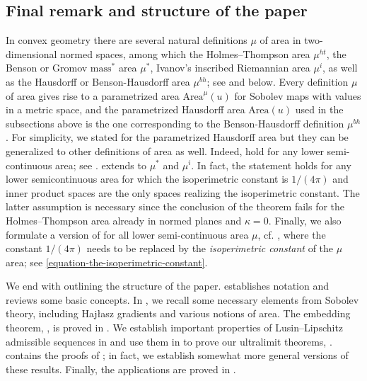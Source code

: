 \documentclass[a4paper,leqno]{amsart}
\numberwithin{equation}{section}
\theoremstyle{remark}
\theoremstyle{remark}
\begin{document}
\subsection{Final remark and structure of the paper}\label{section-structure-of-the-paper}
In convex geometry there are several natural definitions $\mu$ of area in two-dimensional normed spaces, among which the Holmes--Thompson area $\mu^{ht}$, the Benson or Gromov $\text{mass}^{*}$ area $\mu^{*}$, Ivanov's inscribed Riemannian area $\mu^{i}$, as well as the Hausdorff or Benson-Hausdorff area $\mu^{bh}$; see \cite{alvarez-thompson-2004-volumes-on-normed-and-finsler-spaces} and  below. Every definition $\mu$ of area gives rise to a parametrized area $\mathrm{Area}^\mu(u)$ for Sobolev maps with values in a metric space, and the parametrized Hausdorff area $\mathrm{Area}(u)$ used in the subsections above is the one corresponding to the Benson-Hausdorff definition $\mu^{bh}$. For simplicity, we stated  for the parametrized Hausdorff area but they can be generalized to other definitions of area as well. Indeed,  hold for any lower semi-continuous area; see .   extends to $\mu^*$ and $\mu^{i}$. In fact, the statement holds for any lower semicontinuous area for which the isoperimetric constant is $1/(4\pi)$ and inner product spaces are the only spaces realizing the isoperimetric constant. The latter assumption is necessary since the conclusion of the theorem fails for the Holmes--Thompson area already in normed planes and $\kappa = 0$.
Finally, we also formulate a version of  for all lower semi-continuous area $\mu$, cf. , where the constant $1/(4\pi)$ needs to be replaced by the \emph{isoperimetric constant} of the $\mu$ area; see \eqref{equation-the-isoperimetric-constant}.

\medskip

We end with outlining the structure of the paper.  establishes notation and reviews some basic concepts. In , we recall some necessary elements from Sobolev theory, including Haj{\l}asz gradients and various notions of area. The embedding theorem, , is proved in . We establish important properties of Lusin--Lipschitz admissible sequences in  and use them in  to prove our ultralimit theorems, .  contains the proofs of ; in fact, we establish somewhat more general versions of these results. Finally, the applications are proved in .
\end{document}

